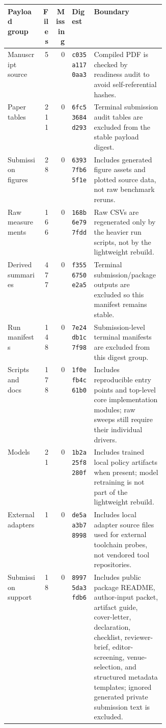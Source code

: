 \begin{tabularx}{\linewidth}{>{\raggedright\arraybackslash}p{0.22\linewidth}rr>{\raggedright\arraybackslash}p{0.14\linewidth}>{\raggedright\arraybackslash}X}
\toprule
Payload group & Files & Missing & Digest & Boundary \\
\midrule
Manuscript source & 5 & 0 & \texttt{c035a1170aa3} & Compiled PDF is checked by readiness audit to avoid self-referential hashes. \\
Paper tables & 211 & 0 & \texttt{6fc53684d293} & Terminal submission audit tables are excluded from the stable payload digest. \\
Submission figures & 28 & 0 & \texttt{63937fb65f1e} & Includes generated figure assets and plotted source data, not raw benchmark reruns. \\
Raw measurements & 166 & 0 & \texttt{168b6e797fdd} & Raw CSVs are regenerated only by the heavier run scripts, not by the lightweight rebuild. \\
Derived summaries & 477 & 0 & \texttt{f3556750e2a5} & Terminal submission/package outputs are excluded so this manifest remains stable. \\
Run manifests & 148 & 0 & \texttt{7e24db1c7f98} & Submission-level terminal manifests are excluded from this digest group. \\
Scripts and docs & 178 & 0 & \texttt{1f0efb4c61b0} & Includes reproducible entry points and top-level core implementation modules; raw sweeps still require their individual drivers. \\
Models & 21 & 0 & \texttt{1b2a25f8280f} & Includes trained local policy artifacts when present; model retraining is not part of the lightweight rebuild. \\
External adapters & 1 & 0 & \texttt{de5aa3b78998} & Includes local adapter source files used for external toolchain probes, not vendored tool repositories. \\
Submission support & 18 & 0 & \texttt{89975da3fdb6} & Includes public package README, author-input packet, artifact guide, cover-letter, declaration, checklist, reviewer-brief, editor-screening, venue-selection, and structured metadata templates; ignored generated private submission text is excluded. \\
\bottomrule
\end{tabularx}
